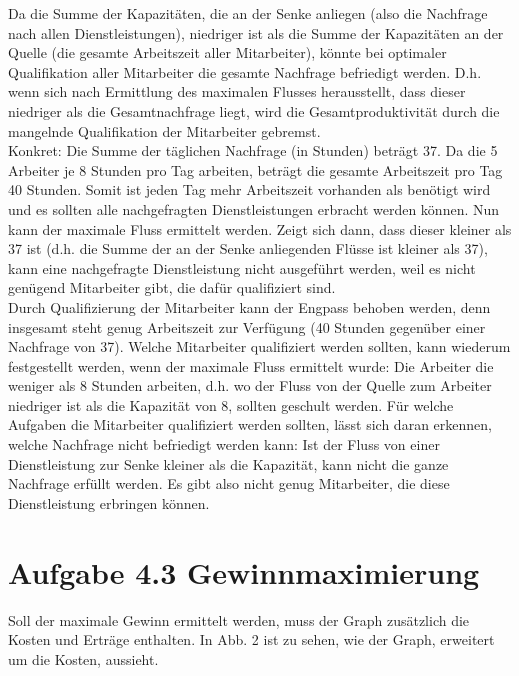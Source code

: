 \documentclass[12pt]{amsart}
\begin{document}
Da die Summe der Kapazitäten, die an der Senke anliegen (also die Nachfrage nach allen Dienstleistungen), niedriger ist als die Summe der Kapazitäten an der Quelle (die gesamte Arbeitszeit aller Mitarbeiter), könnte bei optimaler Qualifikation aller Mitarbeiter die gesamte Nachfrage befriedigt werden. D.h. wenn sich nach Ermittlung des maximalen Flusses herausstellt, dass dieser niedriger als die Gesamtnachfrage liegt, wird die Gesamtproduktivität durch die mangelnde Qualifikation der Mitarbeiter gebremst.\\
Konkret: Die Summe der täglichen Nachfrage (in Stunden) beträgt 37. Da die 5 Arbeiter je 8 Stunden pro Tag arbeiten, beträgt die gesamte Arbeitszeit pro Tag 40 Stunden. Somit ist jeden Tag mehr Arbeitszeit vorhanden als benötigt wird und es sollten alle nachgefragten Dienstleistungen erbracht werden können. Nun kann der maximale Fluss ermittelt werden. Zeigt sich dann, dass dieser kleiner als 37 ist (d.h. die Summe der an der Senke anliegenden Flüsse ist kleiner als 37), kann eine nachgefragte Dienstleistung nicht ausgeführt werden, weil es nicht genügend Mitarbeiter gibt, die dafür qualifiziert sind. \\

Durch Qualifizierung der Mitarbeiter kann der Engpass behoben werden, denn insgesamt steht genug Arbeitszeit zur Verfügung (40 Stunden gegenüber einer Nachfrage von 37). 
Welche Mitarbeiter qualifiziert werden sollten, kann wiederum festgestellt werden, wenn der maximale Fluss ermittelt wurde: Die Arbeiter die weniger als 8 Stunden arbeiten, d.h. wo der Fluss von der Quelle zum Arbeiter niedriger ist als die Kapazität von 8, sollten geschult werden. Für welche Aufgaben die Mitarbeiter qualifiziert werden sollten, lässt sich daran erkennen, welche Nachfrage nicht befriedigt werden kann: Ist der Fluss von einer Dienstleistung zur Senke kleiner als die Kapazität, kann nicht die ganze Nachfrage erfüllt werden. Es gibt also nicht genug Mitarbeiter, die diese Dienstleistung erbringen können.

\section*{Aufgabe 4.3 Gewinnmaximierung}

Soll der maximale Gewinn ermittelt werden, muss der Graph zusätzlich die Kosten und Erträge enthalten. In Abb. 2 ist zu sehen, wie der Graph, erweitert um die Kosten, aussieht.
\end{document}
